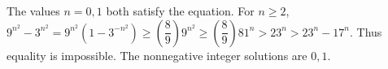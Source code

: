 The values $n=0,1$ both satisfy the equation. For $n\ge2$, $9^{n^2} - 3^{n^2} = 9^{n^2} (1-3^{-n^2}) \ge (\dfrac{8}{9}) 9^{n^2} \ge (\dfrac{8}{9}) 81^n > 23^n > 23^n - 17^n$. Thus equality is impossible. The nonnegative integer solutions are $\boxed{0,1}$.
